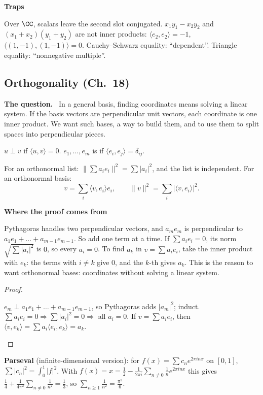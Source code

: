 \documentclass[10pt]{scrartcl}
\newcommand{\ip}[2]{\langle #1,#2\rangle}
\newenvironment{motive}{\begin{mdframed}[style=thinkbox]\textbf{\color{OliveGreen!75!black}Where the proof comes from}\begin{description}[leftmargin=0.9em,labelindent=0pt,itemsep=2pt,topsep=2pt,font=\normalfont\bfseries\color{OliveGreen!70!black}]}{\end{description}\end{mdframed}}
\newenvironment{qbox}{\begin{mdframed}[style=qboxstyle]\textbf{The question.}\ }{\end{mdframed}}
\newenvironment{trapbox}{\begin{mdframed}[style=trapstyle]\textbf{\color{RawSienna}Traps}\begin{itemize}[itemsep=1pt,topsep=1pt]}{\end{itemize}\end{mdframed}}
\newenvironment{steps}{\begin{enumerate}[label=\arabic*.,leftmargin=1.5em,itemsep=2pt,topsep=2pt]}{\end{enumerate}}
\begin{document}
\begin{trapbox}
  \ii Over $\CC$, scalars leave the second slot conjugated.
  \ii $x_1y_1-x_2y_2$ and $(x_1+x_2)(y_1+y_2)$ are not inner products: $\ip{e_2}{e_2}=-1$, $\ip{(1,-1)}{(1,-1)}=0$.
  \ii Cauchy--Schwarz equality: ``dependent''. Triangle equality: ``nonnegative multiple''.
\end{trapbox}

\subsection{Orthogonality (Ch.~18)}

\begin{qbox}
  In a general basis, finding coordinates means solving a linear system. If the basis vectors are perpendicular unit vectors, each coordinate is one inner product. We want such bases, a way to build them, and to use them to split spaces into perpendicular pieces.
\end{qbox}

\begin{definition*}[Def.~46]
  $u\perp v$ if $\ip uv=0$. $e_1,\dots,e_m$ is  if $\ip{e_i}{e_j}=\delta_{ij}$.
\end{definition*}

\begin{proposition*}
  For an orthonormal list: $\|\sum a_ie_i\|^2=\sum|a_i|^2$, and the list is independent. For an orthonormal basis:
  \[ v=\sum_i\ip v{e_i}e_i,\qquad\|v\|^2=\sum_i|\ip v{e_i}|^2. \]
\end{proposition*}
\begin{motive}
  \ii[Norm.] Pythagoras handles two perpendicular vectors, and $a_me_m$ is perpendicular to $a_1e_1+\dots+a_{m-1}e_{m-1}$. So add one term at a time.
  \ii[Independence.] If $\sum a_ie_i=0$, its norm $\sqrt{\sum|a_i|^2}$ is $0$, so every $a_i=0$.
  \ii[Coordinates.] To find $a_k$ in $v=\sum a_ie_i$, take the inner product with $e_k$: the terms with $i\ne k$ give $0$, and the $k$-th gives $a_k$. This is the reason to want orthonormal bases: coordinates without solving a linear system.
\end{motive}
\begin{proof}
  \begin{steps}
    \ii $e_m\perp a_1e_1+\dots+a_{m-1}e_{m-1}$, so Pythagoras adds $|a_m|^2$; induct.
    \ii $\sum a_ie_i=0\Rightarrow\sum|a_i|^2=0\Rightarrow$ all $a_i=0$.
    \ii If $v=\sum a_ie_i$, then $\ip v{e_k}=\sum a_i\ip{e_i}{e_k}=a_k$.
  \end{steps}
\end{proof}
\textbf{Parseval} (infinite-dimensional version): for $f(x)=\sum c_ne^{2\pi inx}$ on $[0,1]$, $\sum|c_n|^2=\int_0^1|f|^2$. With $f(x)=x=\frac12-\frac1{2\pi i}\sum_{n\ne0}\frac1ne^{2\pi inx}$ this gives $\frac14+\frac1{4\pi^2}\sum_{n\ne0}\frac1{n^2}=\frac13$, so $\sum_{n\ge1}\frac1{n^2}=\frac{\pi^2}6$.
\end{document}
